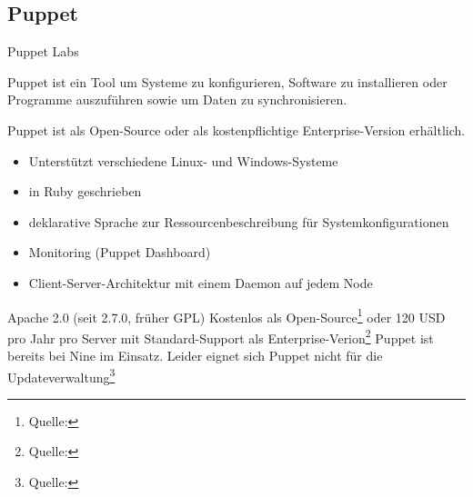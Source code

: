 \subsection{Puppet}

{Puppet Labs}
{Puppet ist ein Tool um Systeme zu konfigurieren, Software zu installieren oder Programme auszuführen sowie um Daten zu synchronisieren.

Puppet ist als Open-Source oder als kostenpflichtige Enterprise-Version erhältlich. }
{\begin{itemize}
\item Unterstützt verschiedene Linux- und Windows-Systeme
\item in Ruby geschrieben
\item deklarative Sprache zur Ressourcenbeschreibung für Systemkonfigurationen
\item Monitoring (Puppet Dashboard)
\item Client-Server-Architektur mit einem Daemon auf jedem Node
\end{itemize}}
{Apache 2.0 (seit 2.7.0, früher GPL)}
{Kostenlos als Open-Source\footnote{Quelle: } oder 120 USD pro Jahr pro Server mit Standard-Support als Enterprise-Verion\footnote{Quelle: }}
{}
{Puppet ist bereits bei Nine im Einsatz. Leider eignet sich Puppet nicht für die Updateverwaltung\footnote{Quelle: }}
